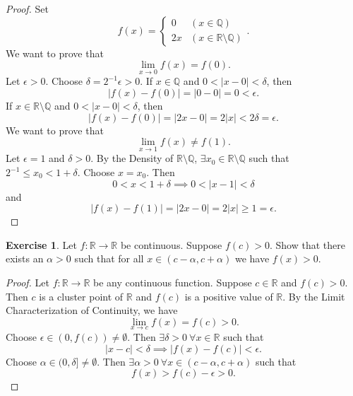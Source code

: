 \documentclass[12pt]{article}
\theoremstyle{definition}
\newtheorem{exercise}{Exercise}
\begin{document}
\begin{proof}
    Set 
    \[
        f(x) = \begin{cases}
            0 & (x \in \mathbb{Q}) \\
            2x & (x \in \mathbb{R} \setminus \mathbb{Q})
        \end{cases}.
    \]
    We want to prove that
    \[
        \lim_{x \to 0}f(x) = f(0).
    \]
    Let \(\epsilon > 0\). Choose \(\delta = 2^{-1}\epsilon > 0\). If \(x \in \mathbb{Q}\) and \(0 < \vert x - 0 \vert < \delta\), then  
    \[
        \vert f(x) - f(0) \vert = \vert 0 - 0 \vert = 0 < \epsilon.
    \]
    If \(x \in \mathbb{R} \setminus \mathbb{Q}\) and \(0 < \vert x - 0 \vert < \delta\), then
    \[
        \vert f(x) - f(0) \vert = \vert 2x - 0 \vert = 2\vert x \vert < 2\delta = \epsilon.
    \]
    We want to prove that
    \[
        \lim_{x \to 1}f(x) \neq f(1).
    \]
    Let \(\epsilon = 1\) and \(\delta > 0\). By the Density of \(\mathbb{R} \setminus \mathbb{Q}\), \(\exists x_0 \in \mathbb{R} \setminus \mathbb{Q}\) such that \(2^{-1} \leq x_0 < 1 + \delta\). Choose \(x = x_0\). Then
    \[
        0 < x < 1 + \delta \implies 0 < \vert x - 1 \vert < \delta
    \]
    and
    \[
        \vert f(x) - f(1) \vert = \vert 2x - 0 \vert = 2\vert x \vert \geq 1 = \epsilon.
    \]
\end{proof}

\begin{exercise}
    Let \(f : \mathbb{R} \to \mathbb{R}\) be continuous. Suppose \(f(c) > 0\). Show that there exists an \(\alpha > 0\) such that for all \(x \in (c - \alpha, c + \alpha)\) we have \(f(x) > 0\).
\end{exercise}

\begin{proof}
    Let \(f : \mathbb{R} \to \mathbb{R}\) be any continuous function. Suppose \(c \in \mathbb{R}\) and \(f(c) > 0\). Then \(c\) is a cluster point of \(\mathbb{R}\) and \(f(c)\) is a positive value of \(\mathbb{R}\). By the Limit Characterization of Continuity, we have
    \[
        \lim_{x \to c}f(x) = f(c) > 0.
    \]
    Choose \(\epsilon \in (0, f(c)) \neq \emptyset\). Then \(\exists \delta > 0 \ \forall x \in \mathbb{R}\) such that
    \[
        \vert x - c \vert < \delta \implies \vert f(x) - f(c) \vert < \epsilon.
    \]
    Choose \(\alpha \in (0,\delta] \neq \emptyset\). Then \(\exists \alpha > 0 \ \forall x \in (c - \alpha, c + \alpha)\) such that
    \[
        f(x) > f(c) - \epsilon > 0.
    \]
\end{proof}
\end{document}
